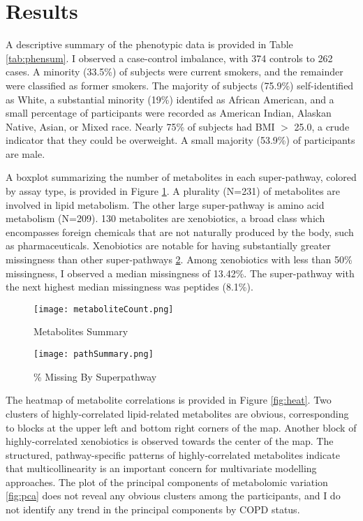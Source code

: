 \documentclass{article}
\begin{document}
\section*{Results}

A descriptive summary of the phenotypic data is provided in Table \ref{tab:phensum}. I observed a case-control imbalance, with 374 controls to 262 cases. A minority (33.5\%) of subjects were current smokers, and the remainder were classified as former smokers. The majority of subjects (75.9\%) self-identified as White, a substantial minority (19\%) identifed as African American, and a small percentage of participants were recorded as American Indian, Alaskan Native, Asian, or Mixed race. Nearly 75\% of subjects had BMI \(>\) 25.0, a crude indicator that they could be overweight. A small majority (53.9\%) of participants are male.

A boxplot summarizing the number of metabolites in each super-pathway, colored by assay type, is provided in Figure \ref{fig:metabSum}. A plurality (N=231) of metabolites are involved in lipid metabolism. The other large super-pathway is amino acid metabolism (N=209). 130 metabolites are xenobiotics, a broad class which encompasses foreign chemicals that are not naturally produced by the body, such as pharmaceuticals. Xenobiotics are notable for having substantially greater missingness than other super-pathways \ref{fig:pathMiss}. Among xenobiotics with less than 50\% missingness, I observed a median missingness of 13.42\%. The super-pathway with the next highest median missingness was peptides (8.1\%).



\begin{figure}
  \centering
  \caption{Metabolites Summary}
  \texttt{[image: metaboliteCount.png]}
  \label{fig:metabSum}
  \end{figure}

\begin{figure}
  \centering
  \caption{\% Missing By Superpathway}
  \texttt{[image: pathSummary.png]}
  \label{fig:pathMiss}
  \end{figure}

The heatmap of metabolite correlations is provided in Figure \ref{fig:heat}. Two clusters of highly-correlated lipid-related metabolites are obvious, corresponding to blocks at the upper left and bottom right corners of the map. Another block of highly-correlated xenobiotics is observed towards the center of the map. The structured, pathway-specific patterns of highly-correlated metabolites indicate that multicollinearity is an important concern for multivariate modelling approaches. The plot of the principal components of metabolomic variation \ref{fig:pca} does not reveal any obvious clusters among the participants, and I do not identify any trend in the principal components by COPD status.
\end{document}
